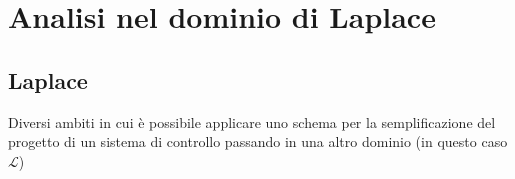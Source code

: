 \part{Analisi nel dominio di Laplace}

\chapter{Laplace}
Diversi ambiti in cui è possibile applicare uno schema per la semplificazione del progetto di un sistema di controllo passando in una altro dominio (in questo caso $\mathcal{L}$)
